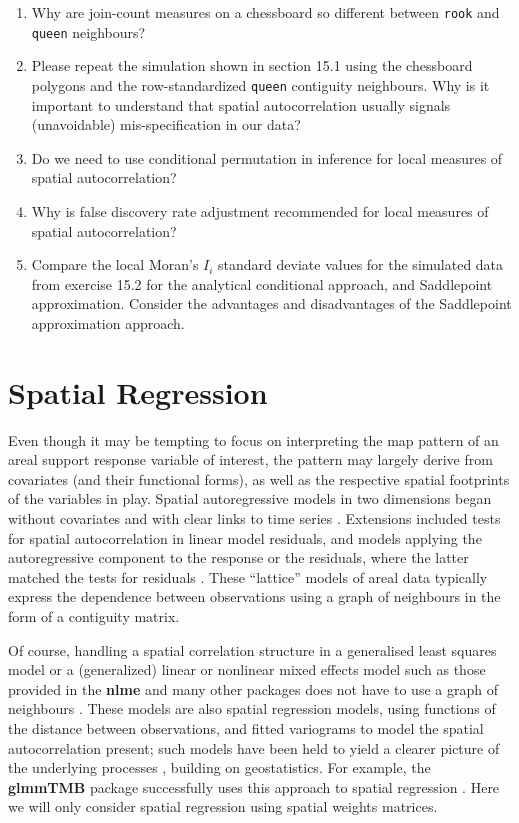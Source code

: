 \documentclass[]{book}
\providecommand{\tightlist}{%
  \setlength{\itemsep}{0pt}\setlength{\parskip}{0pt}}
\begin{document}
\begin{enumerate}
\def\labelenumi{\arabic{enumi}.}
\tightlist
\item
  Why are join-count measures on a chessboard so different between \texttt{rook} and \texttt{queen} neighbours?
\item
  Please repeat the simulation shown in section 15.1 using the chessboard polygons and the row-standardized \texttt{queen} contiguity neighbours. Why is it important to understand that spatial autocorrelation usually signals (unavoidable) mis-specification in our data?
\item
  Do we need to use conditional permutation in inference for local measures of spatial autocorrelation?
\item
  Why is false discovery rate adjustment recommended for local measures of spatial autocorrelation?
\item
  Compare the local Moran's \(I_i\) standard deviate values for the simulated data from exercise 15.2 for the analytical conditional approach, and Saddlepoint approximation. Consider the advantages and disadvantages of the Saddlepoint approximation approach.
\end{enumerate}

\hypertarget{spatglmm}{%
\chapter{Spatial Regression}\label{spatglmm}}

Even though it may be tempting to focus on interpreting the map pattern of an areal support response variable of interest, the pattern may largely derive from covariates (and their functional forms), as well as the respective spatial footprints of the variables in play. Spatial autoregressive models in two dimensions began without covariates and with clear links to time series \citep{whittle:54}. Extensions included tests for spatial autocorrelation in linear model residuals, and models applying the autoregressive component to the response or the residuals, where the latter matched the tests for residuals \citep{CliffOrd:72, cliff+ord:73}. These ``lattice'' models of areal data typically express the dependence between observations using a graph of neighbours in the form of a contiguity matrix.

Of course, handling a spatial correlation structure in a generalised least squares model or a (generalized) linear or nonlinear mixed effects model such as those provided in the \textbf{nlme} and many other packages does not have to use a graph of neighbours \citep{R:Pinheiro+Bates:2000}. These models are also spatial regression models, using functions of the distance between observations, and fitted variograms to model the spatial autocorrelation present; such models have been held to yield a clearer picture of the underlying processes \citep{wall:04}, building on geostatistics. For example, the \textbf{glmmTMB} package successfully uses this approach to spatial regression \citep{brookesetal:17}. Here we will only consider spatial regression using spatial weights matrices.
\end{document}
